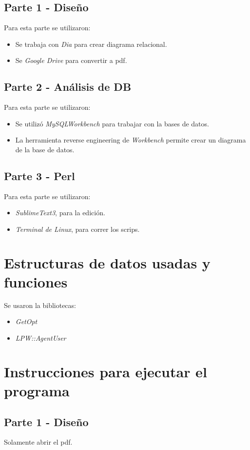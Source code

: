 \documentclass{article}
\begin{document}
\subsection{Parte 1 - Diseño}
Para esta parte se utilizaron:
\begin{itemize}
    \item Se trabaja con \textit{Dia} para crear diagrama relacional.
    \item Se \textit{Google Drive} para convertir a pdf.
\end{itemize}
\subsection{Parte 2 - Análisis de DB}
Para esta parte se utilizaron:
\begin{itemize}
    \item Se utilizó \textit{MySQLWorkbench} para trabajar con la bases de datos.
    \item La herramienta reverse engineering de \textit{Workbench} permite crear un diagrama de la base de datos.
\end{itemize}
\subsection{Parte 3 - Perl}
Para esta parte se utilizaron:

\begin{itemize}
    \item \textit{SublimeText3}, para la edición. 
    \item \textit{Terminal de Linux}, para correr los scrips.
\end{itemize}

\section{Estructuras de datos usadas y funciones}
Se usaron la bibliotecas:
\begin{itemize}
    \item \textit{GetOpt}
    \item \textit{LPW::AgentUser}
\end{itemize}

\section{Instrucciones para ejecutar el programa}
\subsection{Parte 1 - Diseño}
Solamente abrir el pdf.
\end{document}
